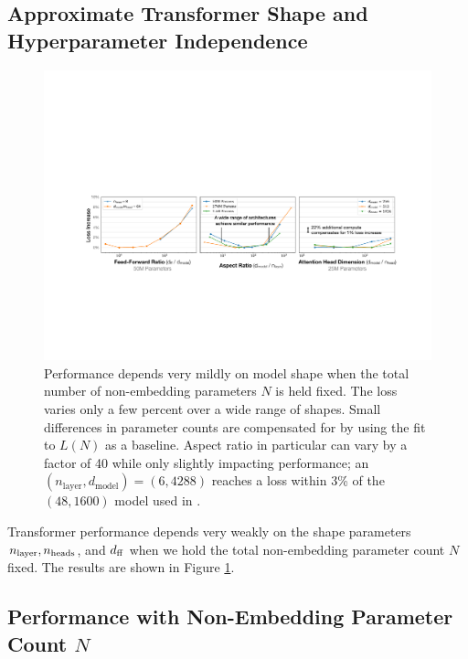 \documentclass[english]{article}
\begin{document}
\subsection{Approximate Transformer Shape and Hyperparameter Independence}
\label{sec:ShapeIndependence}

\begin{figure}
\noindent \centering{} 
\includegraphics[width=\textwidth]{HyperparameterTuning}
 \caption[Weak dependence of performance on hyperparameter tuning]{Performance depends very mildly on model shape when the total number of non-embedding parameters $N$ is held fixed.  The loss varies only a few percent over a wide range of shapes.  Small differences in parameter counts are compensated for by using the fit to $L(N)$ as a baseline.  Aspect ratio in particular can vary by a factor of 40 while only slightly impacting performance; an $(n_{\mathrm{layer}}, d_{\mathrm{model}}) = (6, 4288)$ reaches a loss within 3\% of the $(48, 1600)$ model used in \cite{radford2019language}.  \label{fig:HeadsLayersIndependence}}
\end{figure}

Transformer performance depends very weakly on the shape parameters $n_{\rm layer}, n_{\rm heads}$, and $d_{\rm ff}$ when we hold the total non-embedding parameter count $N$ fixed.  
The results are shown in Figure \ref{fig:HeadsLayersIndependence}.


\subsection{Performance with Non-Embedding Parameter Count $N$} 
\label{sec:PerformancevsModelSize}
\end{document}
